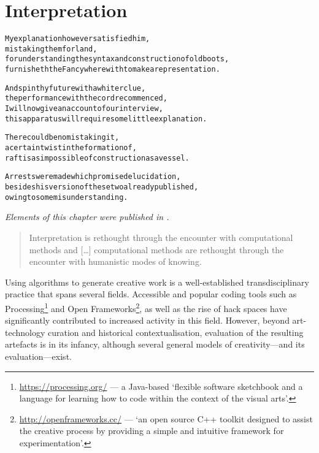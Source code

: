 
\chapter{Interpretation}
\label{ch:interpretation}

\startcontents[chapters]

\vfill

\begin{alltt}\sffamily
My explanation however satisfied him,
mistaking them for land,
for understanding the syntax and construction of old boots,
furnisheth the Fancy wherewith to make a representation.

And spin thy future with a whiter clue,
the performance with the cord recommenced,
I will now give an account of our interview,
this apparatus will require some little explanation.

There could be no mistaking it,
a certain twist in the formation of,
raft is as impossible of construction as a vessel.

Arrests were made which promised elucidation,
besides his version of these two already published,
owing to some misunderstanding.
\end{alltt}

\newpage
\minicontents
\spirals

\emph{Elements of this chapter were published in \autocite{Raczinski2016}.}

\spirals

\begin{quotation}
  Interpretation is rethought through the encounter with computational methods and [\ldots] computational methods are rethought through the encounter with humanistic modes of knowing. 
\end{quotation}

Using algorithms to generate creative work is a well-established transdisciplinary practice that spans several fields. Accessible and popular coding tools such as Processing\footnote{\url{https://processing.org/} --- a Java-based `flexible software sketchbook and a language for learning how to code within the context of the visual arts'.} and Open Frameworks\footnote{\url{http://openframeworks.cc/} --- `an open source C++ toolkit designed to assist the creative process by providing a simple and intuitive framework for experimentation'.}, as well as the rise of hack spaces have significantly contributed to increased activity in this field. However, beyond art-technology curation and historical contextualisation, evaluation of the resulting artefacts is in its infancy, although several general models of creativity---and its evaluation---exist.

